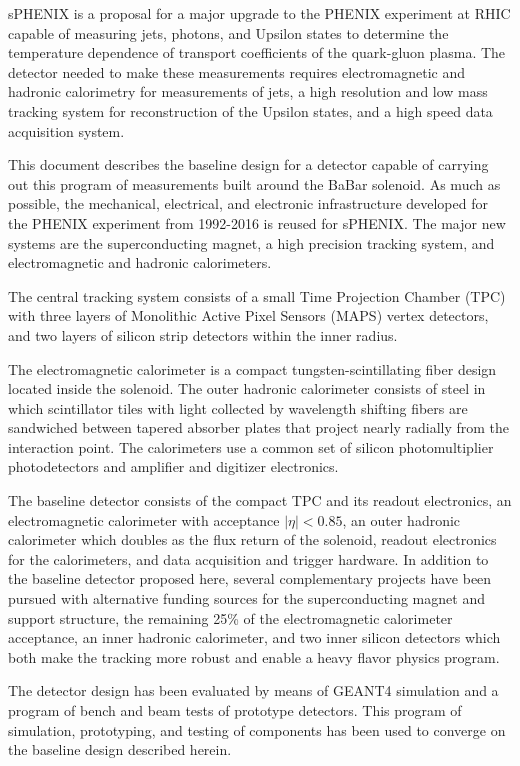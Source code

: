 
sPHENIX\cite{sPHENIX:2015aa} is a proposal for a major upgrade
to the PHENIX experiment at RHIC capable of
measuring jets, photons, and Upsilon states to determine the
temperature dependence of transport coefficients of the quark-gluon plasma.
The detector needed to make these measurements requires electromagnetic and
hadronic calorimetry for measurements of jets, a high resolution and low mass
tracking system for reconstruction of the Upsilon states,
and a high speed data acquisition system.

This document describes the baseline design for a detector capable of carrying
out this program of measurements built around the BaBar solenoid.
As much as possible, the mechanical, electrical, and electronic infrastructure
developed for the PHENIX experiment from 1992-2016 is reused for sPHENIX.
The major new systems are the superconducting magnet, a high precision tracking system, and electromagnetic and hadronic calorimeters.

The central tracking system 
consists of a small Time Projection Chamber (TPC) with
three layers of Monolithic Active Pixel Sensors (MAPS) vertex detectors,
and two layers of silicon strip detectors within the inner radius. 

The electromagnetic calorimeter is a compact tungsten-scintillating fiber
design located inside the solenoid.  
The outer hadronic calorimeter consists of steel in which 
scintillator tiles with light collected by wavelength shifting fibers are sandwiched
between tapered absorber plates that project nearly radially from the interaction point.
The calorimeters use a common set of silicon photomultiplier photodetectors and
amplifier and digitizer electronics.

The baseline detector consists of the compact TPC and its readout electronics, an electromagnetic calorimeter with acceptance $|\eta| < 0.85$, an outer hadronic
calorimeter which doubles as the flux return of the solenoid, readout
electronics for the calorimeters, and data acquisition and trigger hardware.
In addition to the baseline detector proposed here, several complementary projects
have been pursued with alternative funding sources for the superconducting
magnet and support structure, the remaining 25\% of the electromagnetic 
calorimeter acceptance, an inner hadronic calorimeter, and two inner silicon detectors which both make the
tracking more robust and enable a heavy flavor physics program.

The detector design has been evaluated by means of GEANT4 simulation and a program of bench and beam tests of prototype detectors.
This program of simulation, prototyping, and testing of components has been used to converge on the baseline design described herein.
